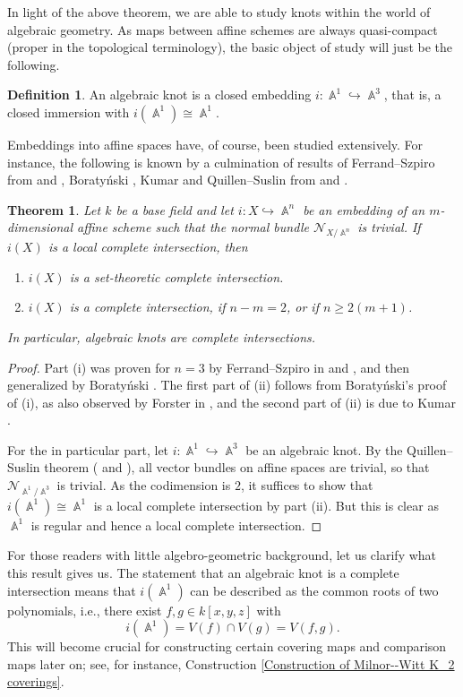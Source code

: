 \documentclass[english]{amsart}
\newtheorem{thm}[prop]{Theorem}
\theoremstyle{definition}
\newtheorem{de}[prop]{Definition}
\DeclareMathOperator{\A}{\mathbb{A}}
\begin{document}
In light of the above theorem, we are able to study knots within the world of algebraic geometry. As maps between affine schemes are always quasi-compact (proper in the topological terminology), the basic object of study will just be the following.
\begin{de}
An algebraic knot is a closed embedding $i \colon \A^1 \hookrightarrow \A^3$, that is, a closed immersion with $i(\A^1) \cong \A^1$.
\end{de}
Embeddings into affine spaces have, of course, been studied extensively. For instance, the following is known by a culmination of results of Ferrand--Szpiro from \cite{MR379517} and \cite{MR572085}, Boraty\'{n}ski \cite{MR511453}, Kumar \cite{MR472851} and Quillen--Suslin from \cite{MR427303} and \cite{MR469905}.
\begin{thm}
Let $k$ be a base field and let $i \colon X \hookrightarrow \A^n$ be an embedding of an $m$-dimensional affine scheme such that the normal bundle $\mathcal{N}_{X/\!\A^n}$ is trivial. If $i(X)$ is a local complete intersection, then
\begin{enumerate}\label{Knots are Complete Intersections}
\item[(i)] $i(X)$ is a set-theoretic complete intersection.
\item[(ii)] $i(X)$ is a complete intersection, if $n-m = 2$, or if $n \geq 2(m+1)$.
\end{enumerate}
In particular, algebraic knots are complete intersections.
\end{thm}
\begin{proof}
Part (i) was proven for $n = 3$ by Ferrand--Szpiro in \cite{MR379517} and \cite{MR572085}, and then generalized by Boraty\'{n}ski \cite{MR511453}. The first part of (ii) follows from Boraty\'{n}ski's proof of (i), as also observed by Forster in \cite{MR775875}, and the second part of (ii) is due to Kumar \cite{MR472851}. 

For the in particular part, let $i \colon \A^1 \hookrightarrow  \A^3$ be an algebraic knot. By the Quillen--Suslin theorem (\cite{MR427303} and \cite{MR469905}), all vector bundles on affine spaces are trivial, so that $\mathcal{N}_{\A^1\!/\A^3}$ is trivial. As the codimension is $2$, it suffices to show that $i(\A^1) \cong \A^1$ is a local complete intersection by part (ii). But this is clear as $\A^1$ is regular and hence a local complete intersection.
\end{proof} 
For those readers with little algebro-geometric background, let us clarify what this result gives us. The statement that an algebraic knot is a complete intersection means that $i(\A^1)$ can be described as the common roots of two polynomials, i.e., there exist $f,g \in k[x,y,z]$ with 
$$i(\A^1) = V(f) \cap V(g) = V(f,g).$$
This will become crucial for constructing certain covering maps and comparison maps later on; see, for instance, Construction \ref{Construction of Milnor--Witt K_2 coverings}. 
\end{document}
